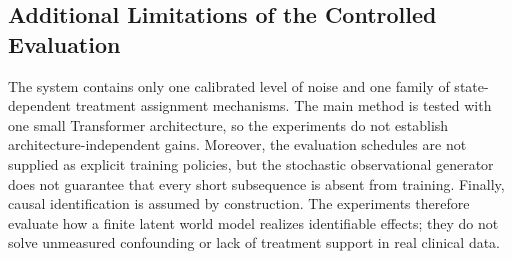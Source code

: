 \subsection{Additional Limitations of the Controlled Evaluation}

The system contains only one calibrated level of noise and one family of
state-dependent treatment assignment mechanisms. The main method is
tested with one small Transformer architecture, so the experiments do
not establish architecture-independent gains. Moreover, the evaluation
schedules are not supplied as explicit training policies, but the
stochastic observational generator does not guarantee that every short
subsequence is absent from training. Finally, causal identification is
assumed by construction. The experiments therefore evaluate how a finite
latent world model realizes identifiable effects; they do not solve
unmeasured confounding or lack of treatment support in real clinical
data.
